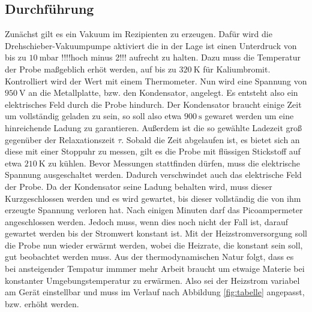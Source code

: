 \subsection{Durchführung}
Zunächst gilt es ein Vakuum im Rezipienten zu erzeugen. Dafür wird die Drehschieber-Vakuumpumpe
aktiviert die in der Lage ist einen Unterdruck von bis zu $\SI{10}{\milli\bar}$ !!!!hoch minus 2!!! aufrecht zu halten.
Dazu muss die Temperatur der Probe maßgeblich erhöt werden, auf bis zu $\SI{320}{\kelvin}$ für Kaliumbromit. Kontrolliert wird der Wert mit einem Thermometer.
Nun wird eine Spannung von $\SI{950}{\volt}$ an die Metallplatte, bzw. den Kondensator, angelegt. Es entsteht also ein elektrisches 
Feld durch die Probe hindurch. Der Kondensator braucht einige Zeit um vollständig geladen zu sein,
so soll also etwa $\SI{900}{\second}$ gewaret werden um eine hinreichende Ladung zu garantieren.
Außerdem ist die so gewählte Ladezeit groß gegenüber der Relaxationszeit $\tau$.
Sobald die Zeit abgelaufen ist, es bietet sich an diese mit einer Stoppuhr zu messen,
gilt es die Probe mit flüssigen Stickstoff auf etwa $\SI{210}{\kelvin}$ zu kühlen.
Bevor Messungen stattfinden dürfen, muss die elektrische Spannung ausgeschaltet werden.
Dadurch verschwindet auch das elektrische Feld der Probe. Da der Kondensator seine Ladung behalten wird,
muss dieser Kurzgeschlossen werden und es wird gewartet, bis dieser vollständig die von ihm erzeugte Spannung verloren hat.
Nach einigen Minuten darf das Picoampermeter angeschlossen werden. Jedoch muss,
wenn dies noch nicht der Fall ist, darauf gewartet werden bis der Stromwert konstant ist.
Mit der Heizstromversorgung soll die Probe nun wieder erwärmt werden, wobei die 
Heizrate, die konstant sein soll, gut beobachtet werden muss. Aus der thermodynamischen Natur 
folgt, dass es bei ansteigender Tempatur immmer mehr Arbeit braucht um etwaige Materie bei 
konstanter Umgebungstemperatur zu erwärmen. Also sei der Heizstrom variabel am Gerät
einstellbar und muss im Verlauf nach Abbildung \ref{fig:tabelle} angepasst, bzw. erhöht werden.


